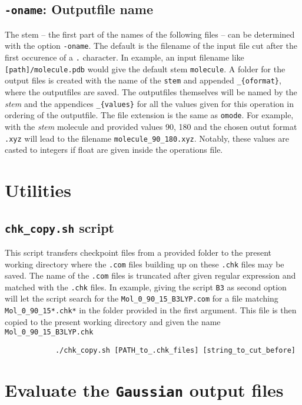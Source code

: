 \documentclass[parskip]{scrartcl}
\begin{document}
    \subsection{\texttt{-oname}: Outputfile name}
    The stem -- the first part of the names of the following files -- 
    can be determined with the option
    \texttt{-oname}. The default is the filename of the input file cut after the first occurence of
    a \texttt{.} character. In example, an input filename like \texttt{[path]/molecule.pdb}
    would give the default stem \texttt{molecule}.
    A folder for the output files is created with the name of the \texttt{stem} and appended
    \texttt{\_\{oformat\}}, where the outputfiles are saved. 
    The outputfiles themselves will be named
    by the \textit{stem} and the appendices \texttt{\_\{values\}} for all the values given for this
    operation in ordering of the outputfile. The file extension is the same as \texttt{omode}. For
    example, with the \textit{stem} molecule and provided values 90, 180 and the chosen outut format
    \texttt{.xyz} will lead to the filename \texttt{molecule\_90\_180.xyz}. 
    Notably, these values are
    casted to integers if float are given inside the operations file.

\section{Utilities}
    \subsection{\texttt{chk\_copy.sh} script}
        This script transfers checkpoint files from a provided folder to the present working
        directory where the \texttt{.com} files building up on these \texttt{.chk} files may
        be saved. 
        The name of the \texttt{.com} files is truncated after
        given regular expression and matched with the \texttt{.chk} files. 
        In example, giving the script \texttt{B3} as second option will let the
        script search for the \texttt{Mol\_0\_90\_15\_B3LYP.com} 
        for a file matching \texttt{Mol\_0\_90\_15*.chk*} in the folder provided in the first
        argument. This file is then copied to the present working directory and given the name
        \texttt{Mol\_0\_90\_15\_B3LYP.chk}
        \begin{verbatim}
            ./chk_copy.sh [PATH_to_.chk_files] [string_to_cut_before]
        \end{verbatim}
\clearpage\section{Evaluate the \texttt{Gaussian} output files}
    
\end{document}
